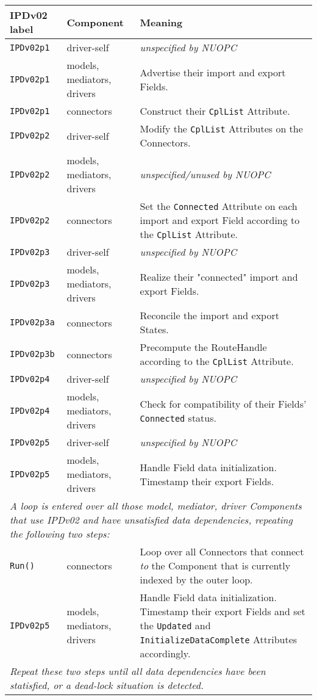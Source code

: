 \vspace*{3ex}
\begin{longtable}[h]{|p{35mm}|p{4cm}|p{6cm}|}
     \hline\hline
     {\bf IPDv02 label} & {\bf Component} & {\bf Meaning}\\
     \hline\hline
     {\tt IPDv02p1} & driver-self                 & {\em unspecified by NUOPC}\\ \hline
     {\tt IPDv02p1} & models, mediators, drivers  & Advertise their import and export Fields.\\ \hline
     {\tt IPDv02p1} & connectors                  & Construct their {\tt CplList} Attribute.\\ \hline
     {\tt IPDv02p2} & driver-self                 & Modify the {\tt CplList} Attributes on the Connectors.\\ \hline
     {\tt IPDv02p2} & models, mediators, drivers  & {\em unspecified/unused by NUOPC}\\ \hline
     {\tt IPDv02p2} & connectors                  & Set the {\tt Connected} Attribute on each import and export Field according to the {\tt CplList} Attribute.\\ \hline
     {\tt IPDv02p3} & driver-self                 & {\em unspecified by NUOPC}\\ \hline
     {\tt IPDv02p3} & models, mediators, drivers  & Realize their "connected" import and export Fields.\\ \hline
     {\tt IPDv02p3a}& connectors                  & Reconcile the import and export States.\\ \hline
     {\tt IPDv02p3b}& connectors                  & Precompute the RouteHandle according to the {\tt CplList} Attribute.\\ \hline
     {\tt IPDv02p4} & driver-self                 & {\em unspecified by NUOPC}\\ \hline
     {\tt IPDv02p4} & models, mediators, drivers  & Check for compatibility of their Fields' {\tt Connected} status.\\ \hline
     {\tt IPDv02p5} & driver-self                 & {\em unspecified by NUOPC}\\ \hline
     {\tt IPDv02p5} & models, mediators, drivers  & Handle Field data initialization. Timestamp their export Fields.\\ \hline
     \multicolumn{3}{|p{13.5cm}|}{\it A loop is entered over all those model, mediator, driver Components that use IPDv02 and have
     unsatisfied data dependencies, repeating the following two steps:}\\ \hline
     {\tt Run()}    & connectors                  & Loop over all Connectors that connect {\it to} the Component that is currently indexed by the outer loop.\\ \hline
     {\tt IPDv02p5} & models, mediators, drivers  & Handle Field data initialization. Timestamp their export Fields and set the {\tt Updated} and {\tt InitializeDataComplete} Attributes accordingly.\\ \hline
     \multicolumn{3}{|p{13.5cm}|}{\it Repeat these two steps until all data
     dependencies have been statisfied, or a dead-lock situation is detected.}\\ 
     \hline\hline
\end{longtable}

